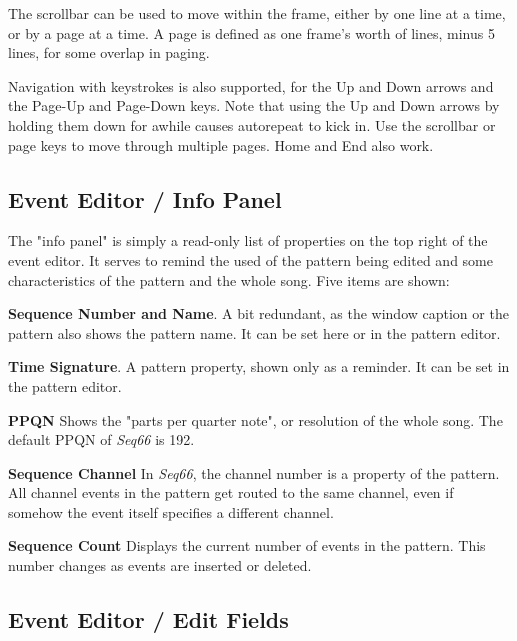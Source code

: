    The scrollbar can be used to move within the frame, either by one line at a
   time, or by a page at a time.  A page is defined as one frame's worth of
   lines, minus 5 lines, for some overlap in paging.

   Navigation with keystrokes is also supported, for the Up and Down arrows and
   the Page-Up and Page-Down keys.  Note that using the Up and Down arrows by
   holding them down for awhile causes autorepeat to kick in.
   Use the scrollbar or page keys to
   move through multiple pages.  Home and End also work.

\subsection{Event Editor / Info Panel}
\label{subsec:event_editor_info}

   The "info panel" is simply a read-only list of properties on the top right
   of the event editor.  It serves to remind the used of the pattern being
   edited and some characteristics of the pattern and the whole song.
   Five items are shown:

   \begin{enumber}
      \item \textbf{Sequence Number and Name}.
         A bit redundant, as the window caption or the pattern
         also shows the pattern name.
         It can be set here or in the pattern editor.
      \item \textbf{Time Signature}.
         A pattern property, shown only as a reminder.
         It can be set in the pattern editor.
      \item \textbf{PPQN}
         Shows the "parts per quarter note", or resolution of the
         whole song.  The default PPQN of \textsl{Seq66} is 192.
      \item \textbf{Sequence Channel}
         In \textsl{Seq66}, the channel number is a property of the
         pattern.  All channel events in the pattern get routed to the same
         channel, even if somehow the event itself specifies a different
         channel.
      \item \textbf{Sequence Count}
         Displays the current number of events in the pattern.
         This number changes as events are inserted or deleted.
   \end{enumber}

\subsection{Event Editor / Edit Fields}
\label{subsec:event_editor_fields}

